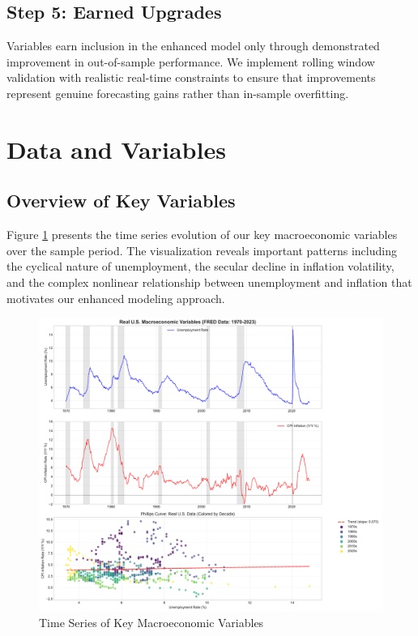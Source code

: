 \documentclass[12pt]{article}
\begin{document}
\subsection{Step 5: Earned Upgrades}

Variables earn inclusion in the enhanced model only through demonstrated improvement in out-of-sample performance. We implement rolling window validation with realistic real-time constraints to ensure that improvements represent genuine forecasting gains rather than in-sample overfitting.

\section{Data and Variables}

\subsection{Overview of Key Variables}

Figure \ref{fig:time_series} presents the time series evolution of our key macroeconomic variables over the sample period. The visualization reveals important patterns including the cyclical nature of unemployment, the secular decline in inflation volatility, and the complex nonlinear relationship between unemployment and inflation that motivates our enhanced modeling approach.

\begin{figure}[H]
\centering
\includegraphics[width=\textwidth]{../figures/time_series_overview.pdf}
\caption{Time Series of Key Macroeconomic Variables}
\label{fig:time_series}
\end{figure}
\end{document}
